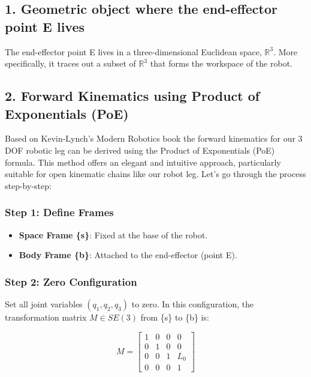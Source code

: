 \begin{solution}
	
	\subsection*{1. Geometric object where the end-effector point E lives}
	
	The end-effector point E lives in a three-dimensional Euclidean space, $\mathbb{R}^3$. More specifically, it traces out a subset of $\mathbb{R}^3$ that forms the workspace of the robot.
	
	\subsection*{2. Forward Kinematics using Product of Exponentials (PoE)}

Based on Kevin-Lynch's Modern Robotics book \cite{lynch2017modern} the forward kinematics for our 3 DOF robotic leg can be derived using the Product of Exponentials (PoE) formula. This method offers an elegant and intuitive approach, particularly suitable for open kinematic chains like our robot leg. Let's go through the process step-by-step:

\subsubsection*{Step 1: Define Frames}
\begin{itemize}
    \item \textbf{Space Frame \{s\}}: Fixed at the base of the robot.
    \item \textbf{Body Frame \{b\}}: Attached to the end-effector (point E).
\end{itemize}

\subsubsection*{Step 2: Zero Configuration}
Set all joint variables $(q_1, q_2, q_3)$ to zero. In this configuration, the transformation matrix $M \in SE(3)$ from \{s\} to \{b\} is:

\begin{equation}
    M = \begin{bmatrix}
    1 & 0 & 0 & 0 \\
    0 & 1 & 0 & 0 \\
    0 & 0 & 1 & L_0 \\
    0 & 0 & 0 & 1
    \end{bmatrix}
\end{equation}


\end{solution}
